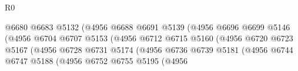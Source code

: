 \begin{lexlean}{R0}
\begin{coremodule}
                                                  @6680
                                                  @6683
                                                  @5132
                                                  (@4956
                                                    @6688
                                                    @6691
                                                    @5139
                                                    (@4956
                                                      @6696
                                                      @6699
                                                      @5146
                                                      (@4956
                                                        @6704
                                                        @6707
                                                        @5153
                                                        (@4956
                                                          @6712
                                                          @6715
                                                          @5160
                                                          (@4956
                                                            @6720
                                                            @6723
                                                            @5167
                                                            (@4956
                                                              @6728
                                                              @6731
                                                              @5174
                                                              (@4956
                                                                @6736
                                                                @6739
                                                                @5181
                                                                (@4956
                                                                  @6744
                                                                  @6747
                                                                  @5188
                                                                  (@4956
                                                                    @6752
                                                                    @6755
                                                                    @5195
                                                                    (@4956

\end{coremodule}
\end{lexlean}
